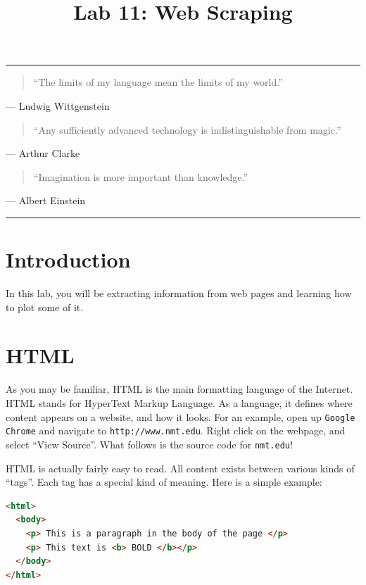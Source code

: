 \documentclass[11pt]{cselabheader}
\title{Lab 11: Web Scraping}
\begin{document}
\maketitle

\hrule
\begin{quotation}
``The limits of my language mean the limits of my world.''
\end{quotation}
\begin{flushright}
--- Ludwig Wittgenstein
\end{flushright}

\begin{quotation}
``Any sufficiently advanced technology is indistinguishable from magic.''
\end{quotation}
\begin{flushright}
--- Arthur Clarke
\end{flushright}

\begin{quotation}
``Imagination is more important than knowledge.''
\end{quotation}
\begin{flushright}
--- Albert Einstein
\end{flushright}

\hrule

\section{Introduction}

In this lab, you will be extracting information from web pages and learning how
to plot some of it.

\section{HTML}

As you may be familiar, HTML is the main formatting language of the
Internet. HTML stands for HyperText Markup Language. As a language, it
defines where content appears on a website, and how it looks. For an
example, open up \texttt{Google Chrome} and navigate to
\texttt{http://www.nmt.edu}. Right click on the webpage, and select
``View Source''. What follows is the source code for \texttt{nmt.edu}!

HTML is actually fairly easy to read. All content exists between
various kinds of ``tags''. Each tag has a special kind of
meaning. Here is a simple example:

\begin{lstlisting}[style=python, language=html]
<html>
  <body>
    <p> This is a paragraph in the body of the page </p>
    <p> This text is <b> BOLD </b></p>
  </body>
</html>
\end{lstlisting}
\end{document}
